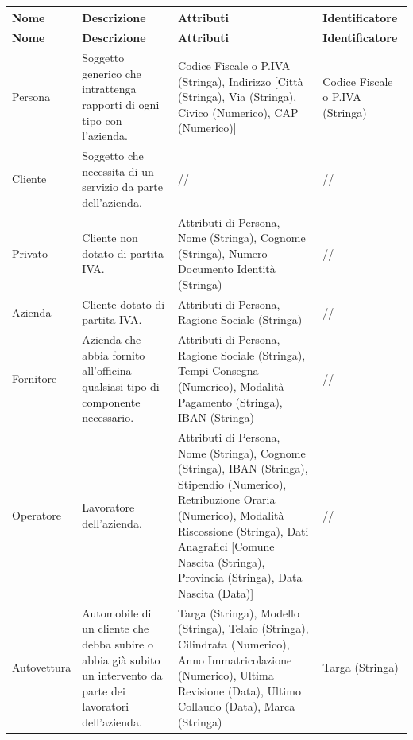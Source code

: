 			{\small
			\begin{longtable}{| p{2cm} | p{4cm} | p{4cm} | p{2cm} |}
				
				\hline
				\textbf{Nome} & 
				\textbf{Descrizione} & 
				\textbf{Attributi} & 
				\textbf{Identificatore} \\ 
				\hline
				
				\endfirsthead
				
				\hline
				\textbf{Nome} & 
				\textbf{Descrizione} & 
				\textbf{Attributi} & 
				\textbf{Identificatore} \\ 
				\hline
				
				\endhead
				
				Persona &
				Soggetto generico che intrattenga rapporti di ogni tipo con l'azienda. &
				Codice Fiscale o P.IVA (Stringa), Indirizzo [Città (Stringa), Via (Stringa), Civico (Numerico), CAP (Numerico)] &
				Codice Fiscale o P.IVA (Stringa)
				\\ \hline

				Cliente &
				Soggetto che necessita di un servizio da parte dell'azienda. &
				// &
				//
				\\ \hline

				Privato &
				Cliente non dotato di partita IVA. &
				Attributi di Persona, Nome (Stringa), Cognome (Stringa), Numero Documento Identità (Stringa) &
				//
				\\ \hline

				Azienda &
				Cliente dotato di partita IVA. &
				Attributi di Persona, Ragione Sociale (Stringa) &
				//
				\\ \hline

				Fornitore &
				Azienda che abbia fornito all’officina qualsiasi tipo di componente necessario. &
				Attributi di Persona, Ragione Sociale (Stringa), Tempi Consegna (Numerico), Modalità Pagamento (Stringa), IBAN (Stringa) &
				//
				\\ \hline

				Operatore &
				Lavoratore dell'azienda. &
				Attributi di Persona, Nome (Stringa), Cognome (Stringa), IBAN (Stringa), Stipendio (Numerico), Retribuzione Oraria (Numerico), Modalità Riscossione (Stringa), Dati Anagrafici [Comune Nascita (Stringa), Provincia (Stringa), Data Nascita (Data)] &
				//
				\\ \hline

				Autovettura &
				Automobile di un cliente che debba subire o abbia già subito un intervento da parte dei lavoratori dell’azienda. &
				Targa (Stringa), Modello (Stringa), Telaio (Stringa), Cilindrata (Numerico), Anno Immatricolazione (Numerico), Ultima Revisione (Data), Ultimo Collaudo (Data), Marca (Stringa) &
				Targa (Stringa)
				\\ \hline


\end{longtable}}
